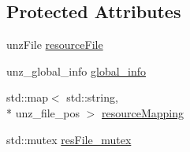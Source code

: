 \subsection*{Protected Attributes}
\begin{DoxyCompactItemize}
\item 
unz\-File \hyperlink{class_osiris_i_1_1_resources_1_1_z_i_p_resource_file_a95a341dd847ff8e80ccc6bfa7f37826f}{resource\-File}
\item 
unz\-\_\-global\-\_\-info \hyperlink{class_osiris_i_1_1_resources_1_1_z_i_p_resource_file_a6e1eb5c280212768fc714a19138a61e0}{global\-\_\-info}
\item 
std\-::map$<$ std\-::string, \\*
unz\-\_\-file\-\_\-pos $>$ \hyperlink{class_osiris_i_1_1_resources_1_1_z_i_p_resource_file_aac135bd9c1c42a52811f379d4f5aaae6}{resource\-Mapping}
\item 
std\-::mutex \hyperlink{class_osiris_i_1_1_resources_1_1_z_i_p_resource_file_a8eef89782e3d312ceed714f7fa7bafe5}{res\-File\-\_\-mutex}
\end{DoxyCompactItemize}


